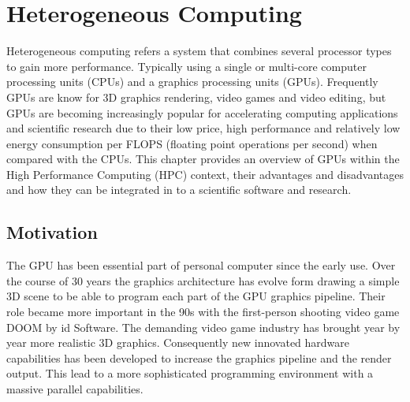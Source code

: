 

\chapter{Heterogeneous Computing} %

\label{Heterogeneous Computing} %



Heterogeneous computing refers a system that combines several processor types to gain more performance. Typically using a single or multi-core computer processing units (CPUs) and a  graphics processing units (GPUs).
Frequently GPUs are know for 3D graphics rendering, video games and video editing, but GPUs are becoming increasingly popular for accelerating computing applications and scientific research due to their low price, high performance and relatively low energy consumption per FLOPS (floating point operations per second) when compared with the CPUs. This chapter provides an overview of GPUs within the High Performance Computing (HPC) context, their advantages and disadvantages and how they can be integrated in to a scientific software and research.



\section{Motivation}


The GPU has been essential part of personal computer since the early use. Over the course of 30 years the graphics architecture has evolve form drawing a simple 3D scene to be able to program each part of the GPU graphics pipeline. Their role became more important in the 90s with the first-person shooting video game DOOM by id Software. The demanding video game industry has brought year by year more realistic 3D graphics. Consequently new innovated hardware capabilities has been developed to increase the graphics pipeline and the render output. This lead to a more sophisticated programming environment with a massive parallel capabilities.

